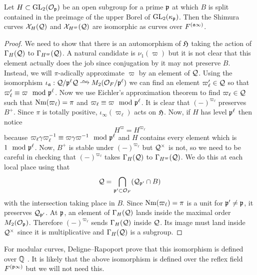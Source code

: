 \documentclass[main.tex]{subfiles}
\begin{document}
\begin{prop} \label{prop:conjugation_isomorphism}
Let $H \subset \GL_2(\cO_{\p})$ be an open subgroup for a prime $\p$ at which $B$ is split contained in the preimage of the upper Borel of $\GL_2(\kappa_{\p})$. Then the Shimura curves $\X_H(\cQ)$ and $\X_{H^{\varpi}}(\cQ)$ are isomorphic as curves over $F^{(\aa \infty)}$.
\end{prop}

\begin{proof}
We need to show that there is an automorphism of $\frH$ taking the action of $\Gamma_H(\cQ)$ to $\Gamma_{H^{\varpi}}(\cQ)$. A natural candidate is $\nu_1(\varpi)$ but it is not clear that this element actually does the job since conjugation by it may not preserve $B$. Instead, we will $\pi$-adically approximate $\varpi$ by an element of $\cQ$. Using the isomorphism $\iota_{\aa} : \cQ / \p^{\ell} \cQ \iso M_2(\cO_F / \p^{\ell})$ we can find an element $\varpi_{\ell}' \in \cQ$ so that $\varpi_{\ell}' \equiv \varpi \mod \p^{\ell}$. Now we use Eichler's approximation theorem to find $\varpi_{\ell} \in \cQ$ such that $\Nm(\varpi_{\ell}) = \pi$ and $\varpi_{\ell} \equiv \varpi \mod \p^{\ell}$. It is clear that $(-)^{\varpi_{\ell}}$ preserves $B^+$. Since $\pi$ is totally positive, $\iota_{\infty}(\varpi_{\ell})$ acts on $\frH$. Now, if $H$ has level $\p^{\ell}$ then notice
\[ H^{\varpi} = H^{\varpi_{\ell}} \]
because $\varpi_{\ell} \gamma \varpi^{-1}_{\ell} \equiv \varpi \gamma \varpi^{-1} \mod \p^{\ell}$ and $H$ contains every element which is $1 \mod \p^{\ell}$. Now, $B^+$ is stable under $(-)^{\varpi_{\ell}}$ but $\cQ^{\times}$ is not, so we need to be careful in checking that $(-)^{\varpi_{\ell}}$ takes $\Gamma_H(\cQ)$ to $\Gamma_{H^{\varpi}}(\cQ)$. We do this at each local place using that
\[ \cQ = \bigcap_{\p' \subset \cO_F} (\cQ_{\p'} \cap B) \]
with the intersection taking place in $B$. Since $\Nm(\varpi_{\ell}) = \pi$ is a unit for $\p' \neq \p$, it preserves $\cQ_{\p'}$. At $\p$, an element of $\Gamma_H(\cQ)$ lands inside the maximal order $M_2(\cO_{\p})$. Therefore $(-)^{\varpi_{\ell}}$ sends $\Gamma_H(\cQ)$ inside $\cQ$. Its image must land inside $\cQ^{\times}$ since it is multiplicative and $\Gamma_H(\cQ)$ is a subgroup.
\end{proof}

For modular curves, Deligne--Rapoport prove that this isomorphism is defined over $\Q$ \cite[Propositions IV-3.16 and IV-3.19]{deligne:schemas_modules}. It is likely that the above isomorphism is defined over the reflex field $F^{(\p \infty)}$ but we will not need this.
\end{document}
